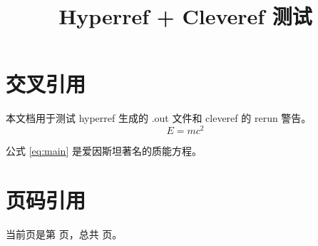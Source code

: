 \documentclass{article}
\title{Hyperref + Cleveref 测试}
\author{}
\date{}
\begin{document}
\maketitle

\section{交叉引用}

本文档用于测试 hyperref 生成的 .out 文件和 cleveref 的 rerun 警告。
\begin{equation}
    \label{eq:main}
    E = mc^2
\end{equation}

公式 \cref{eq:main} 是爱因斯坦著名的质能方程。

\section{页码引用}

当前页是第 \thepage{} 页，总共 \pageref{LastPage} 页。
\end{document}

